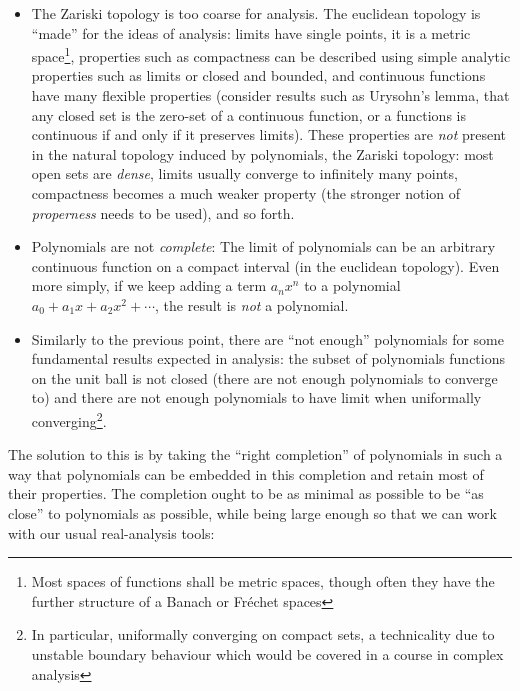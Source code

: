 \documentclass{article}
\begin{document}
\begin{itemize}
  \item The Zariski topology is too coarse for analysis. The euclidean topology is ``made'' for
    the ideas of analysis: limits have single points, it is a metric space\footnote{Most spaces of functions
    shall be metric spaces, though often they have the further structure of a Banach or Fr\'echet spaces}, properties such as
    compactness can be described using simple analytic properties such as limits or closed and bounded, and
    continuous functions have many flexible properties (consider results such as Urysohn's lemma, that any
    closed set is the zero-set of a continuous function, or a functions is continuous if and only if it
    preserves limits). These properties are \emph{not} present in the natural topology induced by polynomials,
    the Zariski topology: most open sets are \emph{dense}, limits usually converge to infinitely many points,
    compactness becomes a much weaker property (the stronger notion of \emph{properness} needs to be
    used), and so forth.

  \item Polynomials are not \emph{complete}: The limit of polynomials can be an arbitrary continuous function
    on a compact interval (in the euclidean topology). Even more simply, if we keep adding a term $a_nx^n$ to a polynomial $a_0 + a_1x
    + a_2x^2 + \cdots$, the result is \emph{not} a polynomial.
  \item Similarly to the previous point, there are ``not enough'' polynomials for some fundamental results
    expected in analysis: the subset of polynomials functions on the unit ball is not closed (there are not
    enough polynomials to converge to) and there are not enough polynomials to have limit when uniformally
    converging\footnote{In particular, uniformally converging on compact sets, a technicality due to unstable
    boundary behaviour which would be covered in a course in complex analysis}.
\end{itemize}

The solution to this is by taking the ``right completion'' of polynomials in such a way that polynomials can
be embedded in this completion and retain most of their properties. The completion ought to be as minimal
as possible to be ``as close'' to polynomials as possible, while being large enough so that we can work with
our usual real-analysis tools:
\end{document}
